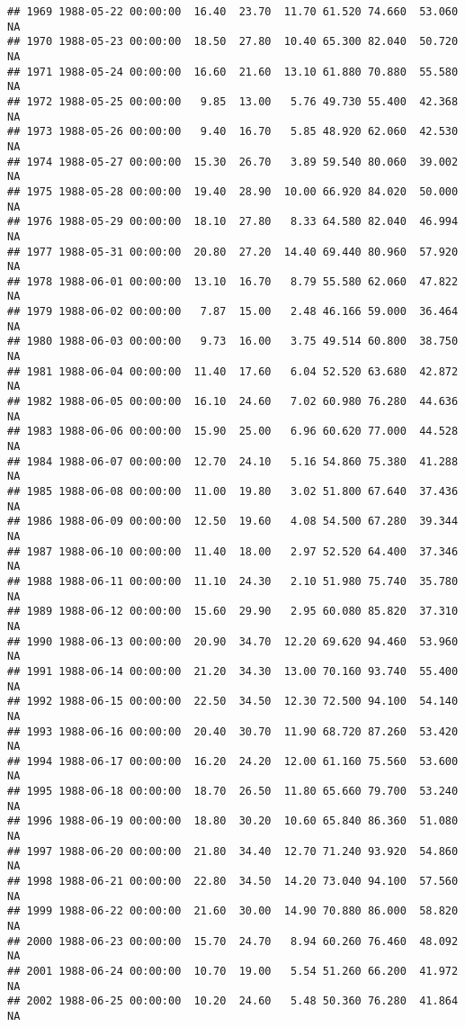 \documentclass{article}\usepackage{graphicx, color}
\makeatletter
\newenvironment{kframe}{%
 \def\at@end@of@kframe{}%
 \ifinner\ifhmode%
  \def\at@end@of@kframe{\end{minipage}}%
  \begin{minipage}{\columnwidth}%
 \fi\fi%
 \def\FrameCommand##1{\hskip\@totalleftmargin \hskip-\fboxsep
 \colorbox{shadecolor}{##1}\hskip-\fboxsep
     \hskip-\linewidth \hskip-\@totalleftmargin \hskip\columnwidth}%
 \MakeFramed {\advance\hsize-\width
   \@totalleftmargin\z@ \linewidth\hsize
   \@setminipage}}%
 {\par\unskip\endMakeFramed%
 \at@end@of@kframe}
\newenvironment{knitrout}{}{} %
\makeatother
\begin{document}
\begin{knitrout}
\begin{kframe}
\begin{verbatim}
## 1969 1988-05-22 00:00:00  16.40  23.70  11.70 61.520 74.660  53.060     NA
## 1970 1988-05-23 00:00:00  18.50  27.80  10.40 65.300 82.040  50.720     NA
## 1971 1988-05-24 00:00:00  16.60  21.60  13.10 61.880 70.880  55.580     NA
## 1972 1988-05-25 00:00:00   9.85  13.00   5.76 49.730 55.400  42.368     NA
## 1973 1988-05-26 00:00:00   9.40  16.70   5.85 48.920 62.060  42.530     NA
## 1974 1988-05-27 00:00:00  15.30  26.70   3.89 59.540 80.060  39.002     NA
## 1975 1988-05-28 00:00:00  19.40  28.90  10.00 66.920 84.020  50.000     NA
## 1976 1988-05-29 00:00:00  18.10  27.80   8.33 64.580 82.040  46.994     NA
## 1977 1988-05-31 00:00:00  20.80  27.20  14.40 69.440 80.960  57.920     NA
## 1978 1988-06-01 00:00:00  13.10  16.70   8.79 55.580 62.060  47.822     NA
## 1979 1988-06-02 00:00:00   7.87  15.00   2.48 46.166 59.000  36.464     NA
## 1980 1988-06-03 00:00:00   9.73  16.00   3.75 49.514 60.800  38.750     NA
## 1981 1988-06-04 00:00:00  11.40  17.60   6.04 52.520 63.680  42.872     NA
## 1982 1988-06-05 00:00:00  16.10  24.60   7.02 60.980 76.280  44.636     NA
## 1983 1988-06-06 00:00:00  15.90  25.00   6.96 60.620 77.000  44.528     NA
## 1984 1988-06-07 00:00:00  12.70  24.10   5.16 54.860 75.380  41.288     NA
## 1985 1988-06-08 00:00:00  11.00  19.80   3.02 51.800 67.640  37.436     NA
## 1986 1988-06-09 00:00:00  12.50  19.60   4.08 54.500 67.280  39.344     NA
## 1987 1988-06-10 00:00:00  11.40  18.00   2.97 52.520 64.400  37.346     NA
## 1988 1988-06-11 00:00:00  11.10  24.30   2.10 51.980 75.740  35.780     NA
## 1989 1988-06-12 00:00:00  15.60  29.90   2.95 60.080 85.820  37.310     NA
## 1990 1988-06-13 00:00:00  20.90  34.70  12.20 69.620 94.460  53.960     NA
## 1991 1988-06-14 00:00:00  21.20  34.30  13.00 70.160 93.740  55.400     NA
## 1992 1988-06-15 00:00:00  22.50  34.50  12.30 72.500 94.100  54.140     NA
## 1993 1988-06-16 00:00:00  20.40  30.70  11.90 68.720 87.260  53.420     NA
## 1994 1988-06-17 00:00:00  16.20  24.20  12.00 61.160 75.560  53.600     NA
## 1995 1988-06-18 00:00:00  18.70  26.50  11.80 65.660 79.700  53.240     NA
## 1996 1988-06-19 00:00:00  18.80  30.20  10.60 65.840 86.360  51.080     NA
## 1997 1988-06-20 00:00:00  21.80  34.40  12.70 71.240 93.920  54.860     NA
## 1998 1988-06-21 00:00:00  22.80  34.50  14.20 73.040 94.100  57.560     NA
## 1999 1988-06-22 00:00:00  21.60  30.00  14.90 70.880 86.000  58.820     NA
## 2000 1988-06-23 00:00:00  15.70  24.70   8.94 60.260 76.460  48.092     NA
## 2001 1988-06-24 00:00:00  10.70  19.00   5.54 51.260 66.200  41.972     NA
## 2002 1988-06-25 00:00:00  10.20  24.60   5.48 50.360 76.280  41.864     NA

\end{verbatim}
\end{kframe}
\end{knitrout}
\end{document}
